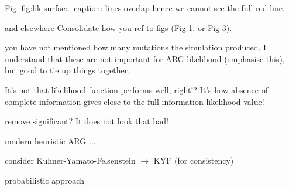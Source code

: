 \reply{
}

\begin{point}{Fig \ref{fig:lik-surface} caption:}
 lines overlap hence we cannot see the full red line.
\end{point}

\reply{
}

\begin{point}{\revref{} and elsewhere} %
 Consolidate how you ref to figs (Fig 1. or Fig 3).
\end{point}

\reply{
}

\begin{point}{\revref} %
 you have not mentioned how many mutations the simulation produced. I understand that these are not important for ARG likelihood (emphasise this), but good to tie up things together.
\end{point}

\reply{
}

\begin{point}{\revref} %
 It's not that likelihood function performs well, right!? It's how absence of complete information gives close to the full information likelihood value!
\end{point}

\reply{
}

\begin{point}{\revref} %
 remove significant? It does not look that bad!
\end{point}

\reply{
}


\begin{point}{\revref} %
 modern heuristic ARG ...
\end{point}


\begin{point}{\revref} %
 consider Kuhner-Yamato-Felsenstein $\to$ KYF (for consistency)
\end{point}


\begin{point}{\revref} %
 probabilistic approach
\end{point}

